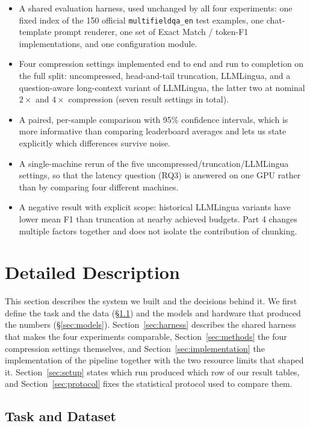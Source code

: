 ﻿\documentclass[10pt,a4paper,twocolumn]{article}
\newcommand{\MFQA}{\texttt{multifieldqa\_\allowbreak en}}
\begin{document}
\begin{itemize}
    \item A shared evaluation harness, used unchanged by all four experiments: one
    fixed index of the 150 official \MFQA{} test examples, one
    chat-template prompt renderer, one set of Exact Match / token-F1
    implementations, and one configuration module.
    \item Four compression settings implemented end to end and run to completion on
    the full split: uncompressed, head-and-tail truncation, LLMLingua, and a
    question-aware long-context variant of LLMLingua, the latter two at nominal
    $2\times$ and $4\times$ compression (seven result settings in total).
    \item A paired, per-sample comparison with 95\% confidence intervals, which is
    more informative than comparing leaderboard averages and lets us state
    explicitly which differences survive noise.
    \item A single-machine rerun of the five uncompressed/truncation/LLMLingua
    settings, so that the latency question (RQ3) is answered on one GPU rather
    than by comparing four different machines.
    \item A negative result with explicit scope: historical LLMLingua variants have lower mean F1 than truncation at nearby achieved budgets. Part 4 changes multiple factors together and does not isolate the contribution of chunking.
\end{itemize}

\section{Detailed Description}

This section describes the system we built and the decisions behind it. We first
define the task and the data (\S\ref{sec:task}) and the models and hardware that
produced the numbers (\S\ref{sec:models}). Section~\ref{sec:harness} describes
the shared harness that makes the four experiments comparable,
Section~\ref{sec:methods} the four compression settings themselves, and
Section~\ref{sec:implementation} the implementation of the pipeline together with
the two resource limits that shaped it. Section~\ref{sec:setup} states which run
produced which row of our result tables, and Section~\ref{sec:protocol} fixes the
statistical protocol used to compare them.

\subsection{Task and Dataset}
\label{sec:task}
\end{document}
